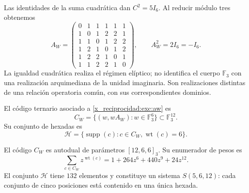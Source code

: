 Las identidades de la suma cuadrática dan $C^2=5I_6$. Al reducir módulo
tres obtenemos
\begin{equation}
 A_W=
 \begin{pmatrix}
 0&1&1&1&1&1\\
 1&0&1&2&2&1\\
 1&1&0&1&2&2\\
 1&2&1&0&1&2\\
 1&2&2&1&0&1\\
 1&1&2&2&1&0
 \end{pmatrix},
 \qquad A_W^2=2I_6=-I_6.
 \label{x_reciprocidad:exc:aw}
\end{equation}
La igualdad cuadrática realiza el régimen elíptico; no identifica el
cuerpo $\mathbb F_3$ con una realización arquimediana de la unidad
imaginaria. Son realizaciones distintas de una relación operatoria
común, con sus correspondientes dominios.

\begin{definition}
\label{x_reciprocidad:exc:codigo}
El código ternario asociado a \eqref{x_reciprocidad:exc:aw} es
\[
 C_W=\{(w,wA_W):w\in\mathbb F_3^6\}
       \subset\mathbb F_3^{12}.
\]
Su conjunto de hexadas es
\[
 \mathcal H=
 \{\operatorname{supp}(c):c\in C_W,
                           \operatorname{wt}(c)=6\}.
\]
\end{definition}

\begin{proposition}
\label{x_reciprocidad:exc:codigo-witt}
El código $C_W$ es autodual de parámetros $[12,6,6]_3$. Su enumerador
de pesos es
\begin{equation}
 \sum_{c\in C_W}z^{\operatorname{wt}(c)}
   =1+264z^6+440z^9+24z^{12}.
 \label{x_reciprocidad:exc:enumerador}
\end{equation}
El conjunto $\mathcal H$ tiene $132$ elementos y constituye un sistema
$S(5,6,12)$: cada conjunto de cinco posiciones está contenido en una
única hexada.
\end{proposition}

